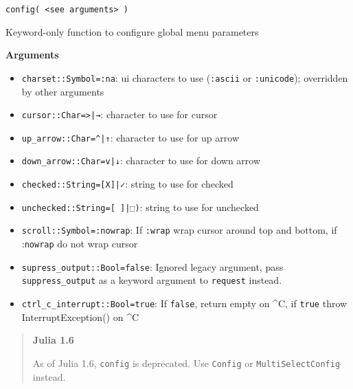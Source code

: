 \begin{adjustwidth}{2em}{0pt}


\begin{verbatim}
config( <see arguments> )
\end{verbatim}

Keyword-only function to configure global menu parameters

\textbf{Arguments}

\begin{itemize}
\item \texttt{charset::Symbol=:na}: ui characters to use (\texttt{:ascii} or \texttt{:unicode}); overridden by other arguments


\item \texttt{cursor::Char={\textquotesingle}>{\textquotesingle}|{\textquotesingle}→{\textquotesingle}}: character to use for cursor


\item \texttt{up\_arrow::Char={\textquotesingle}{\textasciicircum}{\textquotesingle}|{\textquotesingle}↑{\textquotesingle}}: character to use for up arrow


\item \texttt{down\_arrow::Char={\textquotesingle}v{\textquotesingle}|{\textquotesingle}↓{\textquotesingle}}: character to use for down arrow


\item \texttt{checked::String={\textquotedbl}[X]{\textquotedbl}|{\textquotedbl}✓{\textquotedbl}}: string to use for checked


\item \texttt{unchecked::String={\textquotedbl}[ ]{\textquotedbl}|{\textquotedbl}⬚{\textquotedbl})}: string to use for unchecked


\item \texttt{scroll::Symbol=:nowrap}: If \texttt{:wrap} wrap cursor around top and bottom, if :\texttt{nowrap} do not wrap cursor


\item \texttt{supress\_output::Bool=false}: Ignored legacy argument, pass \texttt{suppress\_output} as a keyword argument to \texttt{request} instead.


\item \texttt{ctrl\_c\_interrupt::Bool=true}: If \texttt{false}, return empty on {\textasciicircum}C, if \texttt{true} throw InterruptException() on {\textasciicircum}C

\end{itemize}
\begin{quote}
\textbf{Julia 1.6}

As of Julia 1.6, \texttt{config} is deprecated. Use \texttt{Config} or \texttt{MultiSelectConfig} instead.

\end{quote}


\end{adjustwidth}

